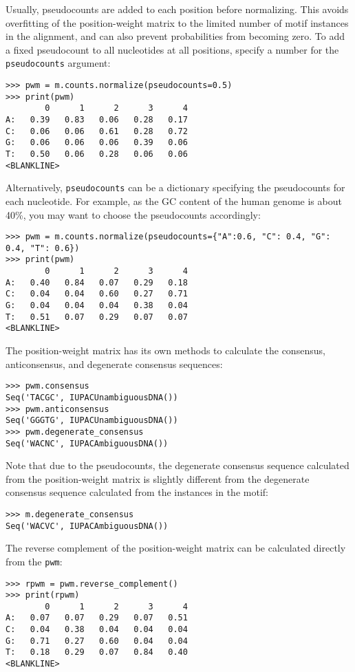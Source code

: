 Usually, pseudocounts are added to each position before normalizing.
This avoids overfitting of the position-weight matrix to the limited
number of motif instances in the alignment, and can also prevent
probabilities from becoming zero. To add a fixed pseudocount to all
nucleotides at all positions, specify a number for the
\verb+pseudocounts+ argument:
\begin{verbatim}
>>> pwm = m.counts.normalize(pseudocounts=0.5)
>>> print(pwm)
        0      1      2      3      4
A:   0.39   0.83   0.06   0.28   0.17
C:   0.06   0.06   0.61   0.28   0.72
G:   0.06   0.06   0.06   0.39   0.06
T:   0.50   0.06   0.28   0.06   0.06
<BLANKLINE>
\end{verbatim}
Alternatively, \verb+pseudocounts+ can be a dictionary specifying the
pseudocounts for each nucleotide. For example, as the GC content of
the human genome is about 40\%, you may want to choose the
pseudocounts accordingly:
\begin{verbatim}
>>> pwm = m.counts.normalize(pseudocounts={"A":0.6, "C": 0.4, "G": 0.4, "T": 0.6})
>>> print(pwm)
        0      1      2      3      4
A:   0.40   0.84   0.07   0.29   0.18
C:   0.04   0.04   0.60   0.27   0.71
G:   0.04   0.04   0.04   0.38   0.04
T:   0.51   0.07   0.29   0.07   0.07
<BLANKLINE>
\end{verbatim}
The position-weight matrix has its own methods to calculate the
consensus, anticonsensus, and degenerate consensus sequences:
\begin{verbatim}
>>> pwm.consensus
Seq('TACGC', IUPACUnambiguousDNA())
>>> pwm.anticonsensus
Seq('GGGTG', IUPACUnambiguousDNA())
>>> pwm.degenerate_consensus
Seq('WACNC', IUPACAmbiguousDNA())
\end{verbatim}
Note that due to the pseudocounts, the degenerate consensus sequence
calculated from the position-weight matrix is slightly different
from the degenerate consensus sequence calculated from the instances
in the motif:
\begin{verbatim}
>>> m.degenerate_consensus
Seq('WACVC', IUPACAmbiguousDNA())
\end{verbatim}
The reverse complement of the position-weight matrix can be calculated directly from the \verb+pwm+:
\begin{verbatim}
>>> rpwm = pwm.reverse_complement()
>>> print(rpwm)
        0      1      2      3      4
A:   0.07   0.07   0.29   0.07   0.51
C:   0.04   0.38   0.04   0.04   0.04
G:   0.71   0.27   0.60   0.04   0.04
T:   0.18   0.29   0.07   0.84   0.40
<BLANKLINE>
\end{verbatim}

